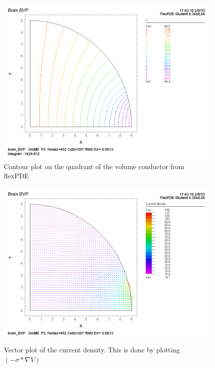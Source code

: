 \documentclass{article}
\begin{document}
\begin{figure}[H]
    \begin{center}
        \includegraphics[scale=0.5]{contour_001.png}
        \caption{Contour plot on the quadrant of the volume conductor from flexPDE}
    \end{center}
\end{figure}

\begin{figure}[H]
    \begin{center}
        \includegraphics[scale=0.5]{J_vec_001.png}
        \caption{Vector plot of the current density. This is done by plotting $(-\sigma*\nabla V)$}
    \end{center}
\end{figure}
\end{document}
